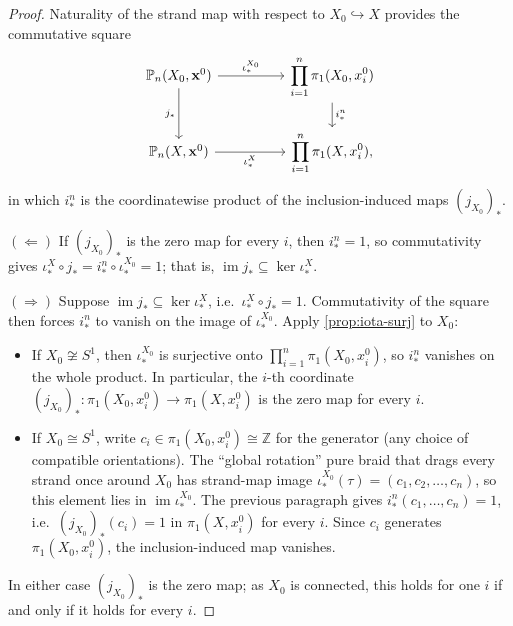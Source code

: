 \documentclass[reqno]{amsart}
\theoremstyle{definition}
\newcommand\bfx{\mathbf{x}}
\newcommand{\PB}{\mathbb{P}}
\newcommand{\im}{\operatorname{im}}
\newcommand{\Z}{\mathbb{Z}}
\newcommand{\base}{\bfx^0}
\numberwithin{equation}{section}
\begin{document}
\begin{proof}
Naturality of the strand map with respect to
\(X_0\hookrightarrow X\) provides the commutative square
\[
\begin{tikzcd}[column sep=huge]
\PB_n(X_0,\base)
    \arrow[r, "\iota_\ast^{X_0}"]
    \arrow[d, "j_\ast"']
& \displaystyle\prod_{i=1}^{n}\pi_1(X_0,x_i^0)
    \arrow[d, "i_\ast^n"] \\
\PB_n(X,\base)
    \arrow[r, "\iota_\ast^X"']
& \displaystyle\prod_{i=1}^{n}\pi_1(X,x_i^0),
\end{tikzcd}
\]
in which \(i_\ast^n\) is the coordinatewise product of the
inclusion-induced maps \((j_{X_0})_\ast\).

\noindent\((\Leftarrow)\) If \((j_{X_0})_\ast\) is the zero map for
every \(i\), then \(i_\ast^n=1\), so commutativity gives
\(\iota_\ast^X\circ j_\ast = i_\ast^n\circ\iota_\ast^{X_0}=1\); that
is, \(\im j_\ast\subseteq\ker\iota_\ast^X\).

\noindent\((\Rightarrow)\) Suppose
\(\im j_\ast\subseteq\ker\iota_\ast^X\), i.e.\
\(\iota_\ast^X\circ j_\ast = 1\). Commutativity of the square then
forces \(i_\ast^n\) to vanish on the image of \(\iota_\ast^{X_0}\).
Apply \cref{prop:iota-surj} to \(X_0\):
\begin{itemize}[leftmargin=2em]
    \item If \(X_0\not\cong S^1\), then \(\iota_\ast^{X_0}\) is surjective
          onto \(\prod_{i=1}^{n}\pi_1(X_0,x_i^0)\), so \(i_\ast^n\) vanishes on
          the whole product. In particular, the \(i\)-th coordinate
          \((j_{X_0})_\ast\colon\pi_1(X_0,x_i^0)\to\pi_1(X,x_i^0)\) is the
          zero map for every \(i\).
    \item If \(X_0\cong S^1\), write \(c_i\in\pi_1(X_0,x_i^0)\cong\Z\) for
          the generator (any choice of compatible orientations). The
          ``global rotation'' pure braid that drags every strand once
          around \(X_0\) has strand-map image
          \(\iota_\ast^{X_0}(\tau) = (c_1,c_2,\dots,c_n)\), so this
          element lies in \(\im\iota_\ast^{X_0}\). The previous paragraph
          gives \(i_\ast^n(c_1,\dots,c_n)=1\), i.e.\
          \((j_{X_0})_\ast(c_i) = 1\) in \(\pi_1(X,x_i^0)\) for every \(i\).
          Since \(c_i\) generates \(\pi_1(X_0,x_i^0)\), the inclusion-induced
          map vanishes.
\end{itemize}
In either case \((j_{X_0})_\ast\) is the zero map; as \(X_0\) is
connected, this holds for one \(i\) if and only if it holds for
every \(i\).
\end{proof}
\end{document}
